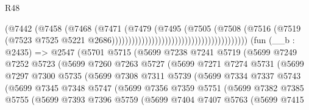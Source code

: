 \begin{lexlean}{R48}
\begin{coremodule}
                                                                (@7442
                                                                  (@7458
                                                                    (@7468
                                                                      (@7471
                                                                        (@7479
                                                                          (@7495
                                                                            (@7505
                                                                              (@7508
                                                                                (@7516
                                                                                  (@7519
                                                                                    (@7523
                                                                                      @7525
                                                                                      @5221
                                                                                      @2686)))))))))))))))))))))))))))))))))))))))))
    (fun (__b : @2435) =>
    @2547
      (@5701
        @5715
        (@5699
          @7238
          @7241
          @5719
          (@5699
            @7249
            @7252
            @5723
            (@5699
              @7260
              @7263
              @5727
              (@5699
                @7271
                @7274
                @5731
                (@5699
                  @7297
                  @7300
                  @5735
                  (@5699
                    @7308
                    @7311
                    @5739
                    (@5699
                      @7334
                      @7337
                      @5743
                      (@5699
                        @7345
                        @7348
                        @5747
                        (@5699
                          @7356
                          @7359
                          @5751
                          (@5699
                            @7382
                            @7385
                            @5755
                            (@5699
                              @7393
                              @7396
                              @5759
                              (@5699
                                @7404
                                @7407
                                @5763
                                (@5699
                                  @7415

\end{coremodule}
\end{lexlean}
